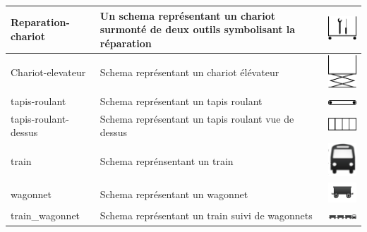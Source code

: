 \begin{longtable}{|m{3cm}|m{9cm}|m{2.5cm}|}
\hline
Reparation-chariot  & Un schema représentant un chariot surmonté de deux outils symbolisant la réparation  & \includegraphics[width=2.5cm]{img/Reparation-chariot.pdf} \\
\hline
Chariot-elevateur  & Schema représentant un chariot élévateur & \includegraphics[width=2.5cm]{img/Chariot-elevateur.pdf} \\
\hline
tapis-roulant  & Schema représentant un tapis roulant & \includegraphics[width=2.5cm]{img/tapis-roulant.pdf} \\
\hline
tapis-roulant-dessus  & Schema représentant un tapis roulant vue de dessus & \includegraphics[width=2.5cm]{img/tapis-roulant-dessus.pdf} \\
\hline
train  & Schema reprénsentant un train & \includegraphics[width=2.5cm]{img/train.png} \\
\hline
wagonnet  & Schema représentant un wagonnet & \includegraphics[width=2.5cm]{img/wagonnet.png} \\
\hline
train\_wagonnet & Schema représentant un train suivi de wagonnets & \includegraphics[width=2.5cm]{img/train_wagonnets.png} \\

\end{longtable}

